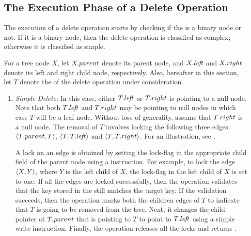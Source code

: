 \subsection{The Execution Phase of a Delete Operation}
The execution of a delete operation starts by checking if the \targetnode{} is a binary node or not. If it is a binary node, then the delete operation is classified as complex; otherwise it is classified as simple. 

For a tree node $X$, let $X.parent$ denote its parent node, and $X.le\!f\!t$ and $X.right$ denote its left and right child node, respectively. Also, hereafter in this section, let $T$ denote the \targetnode{} of the delete operation under consideration.
\begin{enumerate}[label=(\alph*)]
\item \emph{Simple Delete:}
In this case, either $T.le\!f\!t$ or $T.right$ is pointing to a null node. Note that both $T.le\!f\!t$ and $T.right$ may be pointing to null nodes in which case $T$ will be a leaf node. Without loss of generality, assume that $T.right$ is a null node. The removal of $T$ involves locking the following three edges: $\langle {T.parent}, {T} \rangle$, $\langle {T}, {T.le\!f\!t} \rangle$ and $\langle {T}, {T.right} \rangle$. For an illustration, see .


A lock on an edge is obtained by setting the lock-flag in the appropriate child field of the parent node using a \CAS{} instruction. For example, to lock the edge $\langle {X}, {Y} \rangle$, where $Y$ is the left child of $X$, the lock-flag in the left child of $X$ is set to one. If all the edges are locked successfully, then the operation validates that the key stored in the \targetnode{} still matches the target key. If the validation succeeds, then the operation marks both the children edges of $T$  to indicate that $T$ is going to be removed from the tree. Next, it changes the child pointer at $T.parent$ that is pointing to $T$ to point to $T.le\!f\!t$ using a simple write instruction. Finally, the operation releases all the locks and returns \true{}. 


\end{enumerate}

